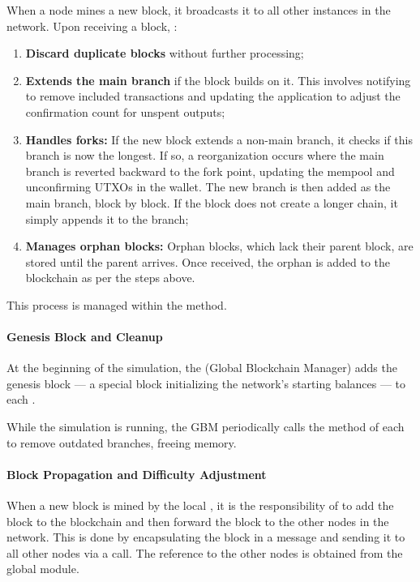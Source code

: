 When a node mines a new block, it broadcasts it to all other
 instances in the network. Upon receiving a block,
:
\begin{enumerate}
	\item \textbf{Discard duplicate blocks} without further processing;
	\item \textbf{Extends the main branch} if the block builds on it. This
		involves notifying  to remove included
		transactions and updating the  application to
		adjust the confirmation count for unspent outputs;
	\item \textbf{Handles forks:} If the new block extends a non-main
		branch, it checks if this branch is now the longest. If so, a
		reorganization occurs where the main branch is reverted
		backward to the fork point, updating the mempool and
		unconfirming UTXOs in the wallet. The new branch is then added
		as the main branch, block by block. If the block does not
		create a longer chain, it simply appends it to the branch;
	\item \textbf{Manages orphan blocks:} Orphan blocks, which lack their
		parent block, are stored until the parent arrives. Once
		received, the orphan is added to the blockchain as per the
		steps above.
\end{enumerate}

This process is managed within the  method.

\paragraph{Genesis Block and Cleanup}\label{par:genesis-block-and-cleanup}

At the beginning of the simulation, the  (Global Blockchain Manager)
adds the genesis block --- a special block initializing the network's starting
balances --- to each .

While the simulation is running, the GBM periodically calls the 
method of each  to remove outdated branches, freeing
memory.

\paragraph{Block Propagation and Difficulty
Adjustment}\label{par:blockprop-and-diffadj}

When a new block is mined by the local , it is the responsibility
of  to add the block to the blockchain and then forward
the block to the other nodes in the network. This is done by encapsulating the
block in a  message and sending it to all other nodes via
a  call. The reference to the other nodes is obtained from the
 global module.

